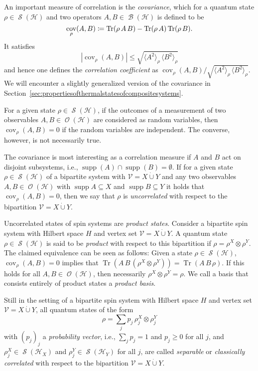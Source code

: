 \documentclass[a4paper,12pt,listof=totoc,index=totoc,bibliography=totoc,headsepline=false,headings=normal,BCOR16.153846mm,DIV12,headinclude,twoside,cleardoublepage=empty,numbers=noenddot,final]{scrreprt}
\theoremstyle{mystyle}
\numberwithin{equation}{section}
\numberwithin{figure}{section}
\numberwithin{lemma}{section}
\numberwithin{theorem}{section}
\numberwithin{corollary}{section}
\numberwithin{definition}{section}
\numberwithin{conjecture}{section}
\numberwithin{observation}{section}
\newcommand{\+}{\mkern2mu}
\newcommand{\coloneqq}{\mathrel{\vcentcolon\mkern-1.2mu=}} %
\newcommand{\dunion}{\mathbin{\dot{\cup}}}
\renewcommand{\H}{H}
\newcommand{\Vset}{\mathcal{V}}
\newcommand{\ex}[2]{\langle #1 \rangle_{#2}}
\DeclareMathOperator{\1}{\mathds{1}}
\DeclareMathOperator{\Bop}{\mathcal{B}}
\DeclareMathOperator{\Obs}{\mathcal{O}}
\DeclareMathOperator{\Qst}{\mathcal{S}}
\DeclareMathOperator{\Tr}{Tr}
\DeclareMathOperator{\supp}{supp}
\DeclareMathOperator{\cov}{cov}
\newcommand{\mc}[1]{\mathcal{#1}}
\newcommand{\mcH}{\mc{H}}
\begin{document}
An important measure of correlation is the \emph{covariance}, which for a quantum state $\rho \in \Qst(\mcH)$ and two operators $A,B \in \Bop(\mcH)$ is defined to be
\begin{equation} \label{eq:covariance}
 \cov_\rho(A,B) \coloneqq \Tr(\rho\,A\,B) - \Tr(\rho\, A) \Tr(\rho \, B) .
\end{equation}
It satisfies
\begin{equation}
 |\cov_\rho(A,B)| \leq \sqrt{\ex{A^2}\rho \, \ex{B^2}\rho}
\end{equation}
and hence one defines the \emph{correlation coefficient} as $\cov_\rho(A,B) / \sqrt{\ex{A^2}\rho \, \ex{B^2}\rho}$.
We will encounter a slightly generalized version of the covariance in Section~\ref{sec:propertiesofthermalstatesofcompositesystems}.

For a given state $\rho \in \Qst(\mcH)$, if the outcomes of a measurement of two observables $A,B \in \Obs(\mcH)$ are considered as random variables, then $\cov_\rho(A,B) = 0$ if the random variables are independent.
The converse, however, is not necessarily true.

The covariance is most interesting as a correlation measure if $A$ and $B$ act on disjoint subsystems, i.e., $\supp(A) \cap \supp(B) = \emptyset$.
If for a given state $\rho \in \Qst(\mcH)$ of a bipartite system with $\Vset = X \dunion Y$ and any two observables $A,B \in \Obs(\mcH)$ with $\supp A \subseteq X$ and $\supp B \subseteq Y$ it holds that $\cov_\rho(A,B) = 0$, then we say that $\rho$ is \emph{uncorrelated} with respect to the bipartition $\Vset = X \dunion Y$.

Uncorrelated states of spin systems are \emph{product states}.
Consider a bipartite spin system with Hilbert space $\H$ and vertex set $\Vset = X \dunion Y$.
A quantum state $\rho \in \Qst(\mcH)$ is said to be \emph{product} with respect to this bipartition if $\rho = \rho^X \otimes \rho^Y$.
The claimed equivalence can be seen as follows:
Given a state $\rho \in \Qst(\mcH)$, $\cov_\rho(A,B) = 0$ implies that $\Tr(A\,B\, (\rho^X \otimes \rho^Y) ) = \Tr(A\,B\,\rho).$ If this holds for all $A,B \in \Obs(\mcH)$, then necessarily $\rho^X \otimes \rho^Y = \rho$.
We call a basis that consists entirely of product states a \emph{product basis}.

Still in the setting of a bipartite spin system with Hilbert space $\H$ and vertex set $\Vset = X \dunion Y$, all quantum states of the form
\begin{equation}
  \rho = \sum_j p_j\, \rho_j^X \otimes \rho_j^Y
\end{equation}
with $(p_j)_j$ a \emph{probability vector}, i.e., $\sum_j p_j = 1$ and $p_j \geq 0$ for all $j$, and $\rho_j^X \in \Qst(\mcH_X)$ and $\rho_j^Y \in \Qst(\mcH_Y)$ for all $j$, are called \emph{separable} or \emph{classically correlated} with respect to the bipartition $\Vset = X \dunion Y$.
\end{document}

